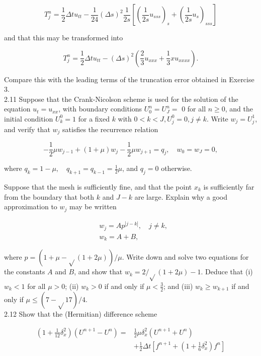 \documentclass[10pt]{article}
\begin{document}
\[
T_{j}^{n}=\frac{1}{2} \Delta t u_{t t}-\frac{1}{24}(\Delta s)^{2} \frac{1}{2 s}\left[\left(\frac{1}{2 s} u_{s s s}\right)_{s}+\left(\frac{1}{2 s} u_{s}\right)_{s s s}\right]
\]

and that this may be transformed into

\[
T_{j}^{n}=\frac{1}{2} \Delta t u_{t t}-(\Delta s)^{2}\left(\frac{2}{3} u_{x x x}+\frac{1}{3} x u_{x x x x}\right) .
\]

Compare this with the leading terms of the truncation error obtained in Exercise 3.\\
2.11 Suppose that the Crank-Nicolson scheme is used for the solution of the equation \(u_{t}=u_{x x}\), with boundary conditions \(U_{0}^{n}=U_{J}^{n}=\) 0 for all \(n \geq 0\), and the initial condition \(U_{k}^{0}=1\) for a fixed \(k\) with \(0<k<J, U_{j}^{0}=0, j \neq k\). Write \(w_{j}=U_{j}^{1}\), and verify that \(w_{j}\) satisfies the recurrence relation

\[
-\frac{1}{2} \mu w_{j-1}+(1+\mu) w_{j}-\frac{1}{2} \mu w_{j+1}=q_{j}, \quad w_{0}=w_{J}=0,
\]

where \(q_{k}=1-\mu, \quad q_{k+1}=q_{k-1}=\frac{1}{2} \mu\), and \(q_{j}=0\) otherwise.

Suppose that the mesh is sufficiently fine, and that the point \(x_{k}\) is sufficiently far from the boundary that both \(k\) and \(J-k\) are large. Explain why a good approximation to \(w_{j}\) may be written

\[
\begin{aligned}
& w_{j}=A p^{|j-k|}, \quad j \neq k, \\
& w_{k}=A+B,
\end{aligned}
\]

where \(p=(1+\mu-\sqrt{ }(1+2 \mu)) / \mu\). Write down and solve two equations for the constants \(A\) and \(B\), and show that \(w_{k}= 2 / \sqrt{ }(1+2 \mu)-1\). Deduce that (i) \(w_{k}<1\) for all \(\mu>0\); (ii) \(w_{k}>0\) if and only if \(\mu<\frac{3}{2}\); and (iii) \(w_{k} \geq w_{k+1}\) if and only if \(\mu \leq(7-\sqrt{ } 17) / 4\).\\
2.12 Show that the (Hermitian) difference scheme

\[
\begin{aligned}
\left(1+\frac{1}{12} \delta_{x}^{2}\right)\left(U^{n+1}-U^{n}\right)= & \frac{1}{2} \mu \delta_{x}^{2}\left(U^{n+1}+U^{n}\right) \\
& +\frac{1}{2} \Delta t\left[f^{n+1}+\left(1+\frac{1}{6} \delta_{x}^{2}\right) f^{n}\right]
\end{aligned}
\]
\end{document}
